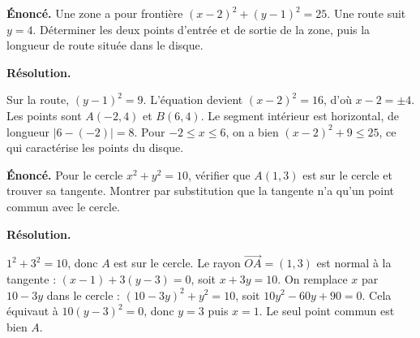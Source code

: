 \documentclass[11pt,a4paper]{article}
\begin{document}
\par\noindent\begin{minipage}{\linewidth}
{\small\color{Muted}\textbf{Énoncé.} Une zone a pour frontière $(x-2)^2+(y-1)^2=25$. Une route suit $y=4$. Déterminer les deux points d’entrée et de sortie de la zone, puis la longueur de route située dans le disque.}
\par\medskip
\textbf{Résolution.}\par
Sur la route, $(y-1)^2=9$. L’équation devient $(x-2)^2=16$, d’où $x-2=\pm4$. Les points sont $A(-2,4)$ et $B(6,4)$. Le segment intérieur est horizontal, de longueur $|6-(-2)|=8$. Pour $-2\le x\le6$, on a bien $(x-2)^2+9\le25$, ce qui caractérise les points du disque.
\end{minipage}\par
\par\noindent\begin{minipage}{\linewidth}
{\small\color{Muted}\textbf{Énoncé.} Pour le cercle $x^2+y^2=10$, vérifier que $A(1,3)$ est sur le cercle et trouver sa tangente. Montrer par substitution que la tangente n’a qu’un point commun avec le cercle.}
\par\medskip
\textbf{Résolution.}\par
$1^2+3^2=10$, donc $A$ est sur le cercle. Le rayon $\overrightarrow{OA}=(1,3)$ est normal à la tangente : $(x-1)+3(y-3)=0$, soit $x+3y=10$. On remplace $x$ par $10-3y$ dans le cercle : $(10-3y)^2+y^2=10$, soit $10y^2-60y+90=0$. Cela équivaut à $10(y-3)^2=0$, donc $y=3$ puis $x=1$. Le seul point commun est bien $A$.
\end{minipage}\par
\end{document}
